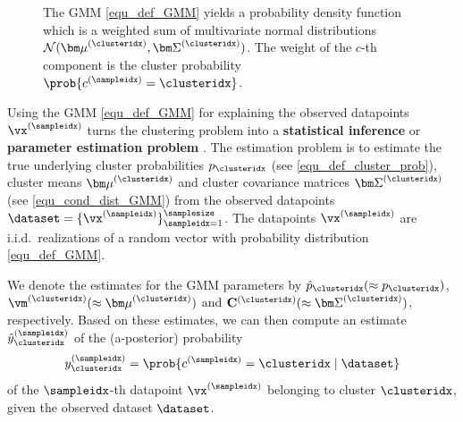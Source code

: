 \documentclass[12pt]{report}
\newcommand{\boundellipse}[3]%
{(#1) ellipse (#2 and #3)
}
\begin{document}
\begin{figure}
\begin{center}
\end{center}
\label{fig_GMM_elippses}
\caption{The GMM \eqref{equ_def_GMM} yields a probability 
	density function which is a weighted sum of multivariate 
	normal distributions $\mathcal{N}({\bm \mu}^{(\clusteridx)}, {\bm \Sigma}^{(\clusteridx)})$. 
    The weight of the $c$-th component is the cluster probability 
    $ \prob{c^{(\sampleidx)}=\clusteridx}$.}
\end{figure}

Using the GMM \eqref{equ_def_GMM} for explaining the observed 
datapoints $\vx^{(\sampleidx)}$ turns the clustering problem into 
a {\bf statistical inference} or {\bf parameter estimation problem} \cite{kay,LC}. 
The estimation problem is to estimate the true underlying cluster 
probabilities $p_{\clusteridx}$ (see \eqref{equ_def_cluster_prob}), cluster 
means ${\bm \mu}^{(\clusteridx)}$ and cluster covariance matrices 
${\bm \Sigma}^{(\clusteridx)}$ (see \eqref{equ_cond_dist_GMM}) from 
the observed datapoints $\dataset = \{ \vx^{(\sampleidx)} \}_{\sampleidx=1}^{\samplesize}$. 
The datapoints $\vx^{(\sampleidx)}$ are i.i.d.\ realizations of a random vector with 
probability distribution \eqref{equ_def_GMM}. 

We denote the estimates for the GMM parameters by $\hat{p}_{\clusteridx} (\approx p_{\clusteridx})$, $\vm^{(\clusteridx)} (\approx {\bm \mu}^{(\clusteridx)})$ and 
$\mathbf{C}^{(\clusteridx)} (\approx {\bm \Sigma}^{(\clusteridx)})$, respectively. 
Based on these estimates, we can then compute an estimate $\hat{y}_{\clusteridx}^{(\sampleidx)}$ 
of the (a-posterior) probability 
\begin{equation} 
y_{\clusteridx}^{(\sampleidx)} = \prob{c^{(\sampleidx)} = \clusteridx \mid \dataset }
\end{equation} 
of the $\sampleidx$-th datapoint $\vx^{(\sampleidx)}$ belonging 
to cluster $\clusteridx$, given the observed dataset $\dataset$. 
\end{document}
